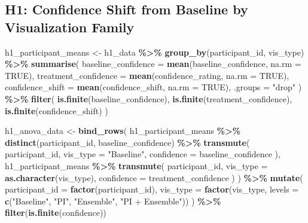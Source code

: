 \documentclass[
]{article}
\newenvironment{Shaded}{\begin{snugshade}}{\end{snugshade}}
\newcommand{\AttributeTok}[1]{\textcolor[rgb]{0.13,0.29,0.53}{#1}}
\newcommand{\ConstantTok}[1]{\textcolor[rgb]{0.56,0.35,0.01}{#1}}
\newcommand{\FunctionTok}[1]{\textcolor[rgb]{0.13,0.29,0.53}{\textbf{#1}}}
\newcommand{\NormalTok}[1]{#1}
\newcommand{\OtherTok}[1]{\textcolor[rgb]{0.56,0.35,0.01}{#1}}
\newcommand{\SpecialCharTok}[1]{\textcolor[rgb]{0.81,0.36,0.00}{\textbf{#1}}}
\newcommand{\StringTok}[1]{\textcolor[rgb]{0.31,0.60,0.02}{#1}}
\begin{document}
\subsection{H1: Confidence Shift from Baseline by Visualization
Family}\label{h1-confidence-shift-from-baseline-by-visualization-family}

\begin{Shaded}
\begin{Highlighting}[]
\NormalTok{h1\_participant\_means }\OtherTok{\textless{}{-}}\NormalTok{ h1\_data }\SpecialCharTok{\%\textgreater{}\%}
  \FunctionTok{group\_by}\NormalTok{(participant\_id, vis\_type) }\SpecialCharTok{\%\textgreater{}\%}
  \FunctionTok{summarise}\NormalTok{(}
    \AttributeTok{baseline\_confidence =} \FunctionTok{mean}\NormalTok{(baseline\_confidence, }\AttributeTok{na.rm =} \ConstantTok{TRUE}\NormalTok{),}
    \AttributeTok{treatment\_confidence =} \FunctionTok{mean}\NormalTok{(confidence\_rating, }\AttributeTok{na.rm =} \ConstantTok{TRUE}\NormalTok{),}
    \AttributeTok{confidence\_shift =} \FunctionTok{mean}\NormalTok{(confidence\_shift, }\AttributeTok{na.rm =} \ConstantTok{TRUE}\NormalTok{),}
    \AttributeTok{.groups =} \StringTok{"drop"}
\NormalTok{  ) }\SpecialCharTok{\%\textgreater{}\%}
  \FunctionTok{filter}\NormalTok{(}
    \FunctionTok{is.finite}\NormalTok{(baseline\_confidence),}
    \FunctionTok{is.finite}\NormalTok{(treatment\_confidence),}
    \FunctionTok{is.finite}\NormalTok{(confidence\_shift)}
\NormalTok{  )}

\NormalTok{h1\_anova\_data }\OtherTok{\textless{}{-}} \FunctionTok{bind\_rows}\NormalTok{(}
\NormalTok{  h1\_participant\_means }\SpecialCharTok{\%\textgreater{}\%}
    \FunctionTok{distinct}\NormalTok{(participant\_id, baseline\_confidence) }\SpecialCharTok{\%\textgreater{}\%}
    \FunctionTok{transmute}\NormalTok{(}
\NormalTok{      participant\_id,}
      \AttributeTok{vis\_type =} \StringTok{"Baseline"}\NormalTok{,}
      \AttributeTok{confidence =}\NormalTok{ baseline\_confidence}
\NormalTok{    ),}
\NormalTok{  h1\_participant\_means }\SpecialCharTok{\%\textgreater{}\%}
    \FunctionTok{transmute}\NormalTok{(}
\NormalTok{      participant\_id,}
      \AttributeTok{vis\_type =} \FunctionTok{as.character}\NormalTok{(vis\_type),}
      \AttributeTok{confidence =}\NormalTok{ treatment\_confidence}
\NormalTok{    )}
\NormalTok{) }\SpecialCharTok{\%\textgreater{}\%}
  \FunctionTok{mutate}\NormalTok{(}
    \AttributeTok{participant\_id =} \FunctionTok{factor}\NormalTok{(participant\_id),}
    \AttributeTok{vis\_type =} \FunctionTok{factor}\NormalTok{(vis\_type, }\AttributeTok{levels =} \FunctionTok{c}\NormalTok{(}\StringTok{"Baseline"}\NormalTok{, }\StringTok{"PI"}\NormalTok{, }\StringTok{"Ensemble"}\NormalTok{, }\StringTok{"PI + Ensemble"}\NormalTok{))}
\NormalTok{  ) }\SpecialCharTok{\%\textgreater{}\%}
  \FunctionTok{filter}\NormalTok{(}\FunctionTok{is.finite}\NormalTok{(confidence))}


\end{Highlighting}
\end{Shaded}
\end{document}
